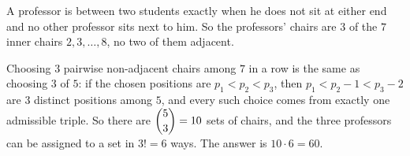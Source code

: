 A professor is between two students exactly when he does not sit at either end and no other professor sits next to him. So the professors' chairs are $3$ of the $7$ inner chairs $2,3,\ldots,8$, no two of them adjacent.

Choosing $3$ pairwise non-adjacent chairs among $7$ in a row is the same as choosing $3$ of $5$: if the chosen positions are $p_1<p_2<p_3$, then $p_1<p_2-1<p_3-2$ are $3$ distinct positions among $5$, and every such choice comes from exactly one admissible triple. So there are $\dbinom53=10$ sets of chairs, and the three professors can be assigned to a set in $3!=6$ ways. The answer is $10\cdot6=\boxed{60}$.
